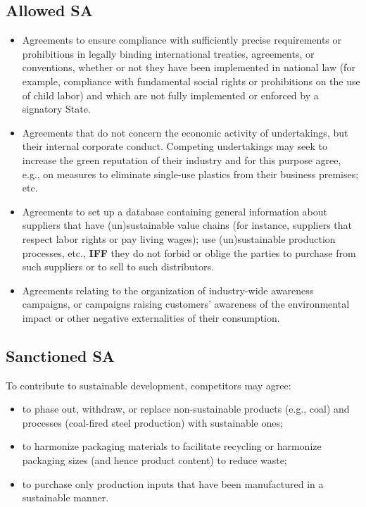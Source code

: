     \subsection{Allowed SA}

        \begin{itemize}
            \item Agreements to ensure compliance with sufficiently precise requirements or prohibitions in legally binding international treaties, agreements, or conventions, whether or not they have been implemented in national law (for example, compliance with fundamental social rights or prohibitions on the use of child labor) and which are not fully implemented or enforced by a signatory State.
            
            \item Agreements that do not concern the economic activity of undertakings, but their internal corporate conduct. Competing undertakings may seek to increase the green reputation of their industry and for this purpose agree, e.g., on measures to eliminate single-use plastics from their business premises; etc.
            
            \item Agreements to set up a database containing general information about suppliers that have (un)sustainable value chains (for instance, suppliers that respect labor rights or pay living wages); use (un)sustainable production processes, etc., \textbf{IFF} they do not forbid or oblige the parties to purchase from such suppliers or to sell to such distributors.
            
            \item Agreements relating to the organization of industry-wide awareness campaigns, or campaigns raising customers' awareness of the environmental impact or other negative externalities of their consumption.
        \end{itemize}

    \subsection{Sanctioned SA}

        To contribute to sustainable development, competitors may agree:
        \begin{itemize}
            \item to phase out, withdraw, or replace non-sustainable products (e.g., coal) and processes (coal-fired steel production) with sustainable ones;
            \item to harmonize packaging materials to facilitate recycling or harmonize packaging sizes (and hence product content) to reduce waste;
            \item to purchase only production inputs that have been manufactured in a sustainable manner.
        \end{itemize}
        
